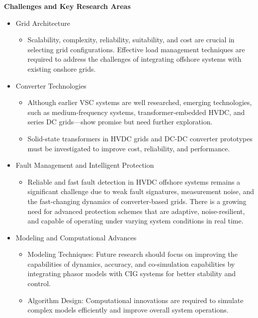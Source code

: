 \documentclass{ieeeaccess}
\begin{document}
\textbf{{Challenges and Key Research Areas}}
\begin{itemize}
\item {Grid Architecture}
\begin{itemize}
\item Scalability, complexity, reliability, suitability, and cost are crucial in selecting grid configurations. Effective {load management techniques} are required to address the challenges of integrating offshore systems with existing onshore grids.
\end{itemize}

\item {Converter Technologies}
\begin{itemize}
    \item Although earlier VSC systems are well researched, emerging technologies, such as medium-frequency systems, transformer-embedded HVDC, and {series DC grids}—show promise but need further exploration.
    \item Solid-state transformers in HVDC grids and {DC-DC converter prototypes} must be investigated to improve cost, reliability, and performance.
\end{itemize}

\item{Fault Management and Intelligent Protection}
\begin{itemize}
\item Reliable and fast fault detection in HVDC offshore systems remains a significant challenge due to weak fault signatures, measurement noise, and the fast-changing dynamics of converter-based grids. There is a growing need for advanced protection schemes that are adaptive, noise-resilient, and capable of operating under varying system conditions in real time.
\end{itemize}

\item {Modeling and Computational Advances}
\begin{itemize}
\item {Modeling Techniques:} Future research should focus on improving the capabilities of dynamics, accuracy, and {co-simulation} capabilities by integrating phasor models with CIG systems for better stability and control.

\item {Algorithm Design:} Computational innovations are required to simulate complex models efficiently and improve overall system operations.
\end{itemize}


\end{itemize}
\end{document}
